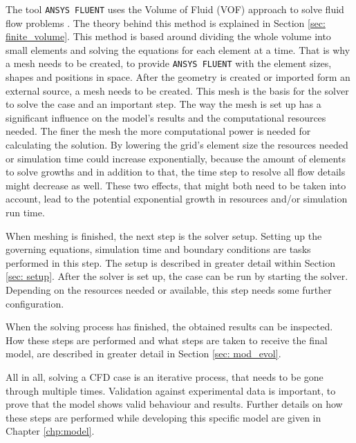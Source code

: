 \documentclass[../thesis.tex]{subfiles}
\begin{document}
The tool \texttt{ANSYS FLUENT} uses the Volume of Fluid (VOF) approach to solve fluid flow problems \cite{manual2009ansys}. The theory behind this method is explained in Section \ref{sec: finite_volume}. This method is based around dividing the whole volume into small elements and solving the equations for each element at a time. That is why a mesh needs to be created, to provide \texttt{ANSYS FLUENT} with the element sizes, shapes and positions in space. After the geometry is created or imported form an external source, a mesh needs to be created. This mesh is the basis for the solver to solve the case and an important step. The way the mesh is set up has a significant influence on the model's results and the computational resources needed. The finer the mesh the more computational power is needed for calculating the solution. By lowering the grid's element size the resources needed or simulation time could increase exponentially, because the amount of elements to solve growths and in addition to that, the time step to resolve all flow details might decrease as well. These two effects, that might both need to be taken into account, lead to the potential exponential growth in resources and/or simulation run time.

When meshing is finished, the next step is the solver setup. Setting up the governing equations, simulation time and boundary conditions are tasks performed in this step. The setup is described in greater detail within Section \ref{sec: setup}. After the solver is set up, the case can be run by starting the solver. Depending on the resources needed or available, this step needs some further configuration.

When the solving process has finished, the obtained results can be inspected. How these steps are performed and what steps are taken to receive the final model, are described in greater detail in Section \ref{sec: mod_evol}.

All in all, solving a CFD case is an iterative process, that needs to be gone through multiple times. Validation against experimental data is important, to prove that the model shows valid behaviour and results. Further details on how these steps are performed while developing this specific model are given in Chapter \ref{chp:model}.
\end{document}
